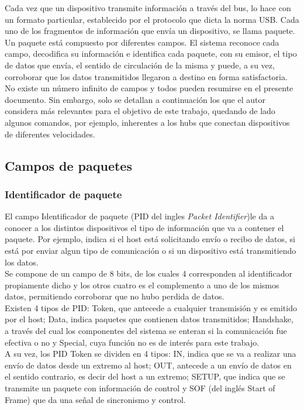 Cada vez que un dispositivo transmite información a través del bus, lo hace con un formato particular, establecido por el protocolo que dicta la norma USB. Cada uno de los fragmentos de información que envía un dispositivo, se llama paquete. Un paquete está compuesto por diferentes campos. El sistema reconoce cada campo, decodifica su información e identifica cada paquete, con su emisor, el tipo de datos que envía, el sentido de circulación de la misma y puede, a su vez, corroborar que los datos transmitidos llegaron a destino en forma satisfactoria. No existe un número infinito de campos y todos pueden resumirse en el presente documento. Sin embargo, solo se detallan a continuación los que el autor considera más relevantes para el objetivo de este trabajo, quedando de lado algunos comandos, por ejemplo, inherentes a los hubs que conectan dispositivos de diferentes velocidades.\\

\subsection{Campos de paquetes}

	\subsubsection*{Identificador de paquete}
		El campo Identificador de paquete (PID del ingles {\it Packet Identifier})le da a conocer a los distintos dispositivos el tipo de información que va a contener el paquete. Por ejemplo, indica si el host está solicitando envío o recibo de datos, si está por enviar algun tipo de comunicación o si un dispositivo está transmitiendo los datos.\\
	
		Se compone de un campo de 8 bits, de los cuales 4 corresponden al identificador propiamente dicho y los otros cuatro es el complemento a uno de los mismos datos, permitiendo corroborar que no hubo perdida de datos.\\
		
		Existen 4 tipos de PID: Token, que antecede a cualquier transmisión y es emitido por el host; Data, indica paquetes que contienen datos transmitidos; Handshake, a través del cual los componentes del sistema se enteran si la comunicación fue efectiva o no y Special, cuya función no es de interés para este trabajo.\\
	
		A su vez, los PID Token se dividen en 4 tipos: IN, indica que se va a realizar una envío de datos desde un extremo al host; OUT, antecede a un envío de datos en el sentido contrario, es decir del host a un extremo; SETUP, que indica que se transmite un paquete con información de control y SOF (del inglés {Start of Frame)} que da una señal de sincronismo y control.\\
	
